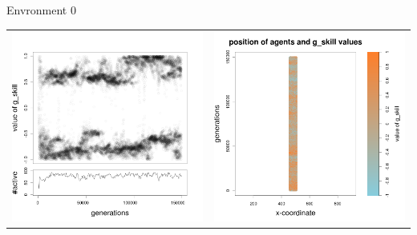 \documentclass[8pt, handout=show,notes=show]{beamer}
\begin{document}
\begin{frame}{Envronment 0}
\begin{table}[H]
\begin{tabular}{cc}
\newline
\includegraphics[width=\imgSize]{../images/5StaticEnv/Gplot47_staticEnv0}&\includegraphics[width=\imgSize]{../images/5StaticEnv/Gplot47Static_staticEnv0}\\
\end{tabular}


\end{table}
\end{frame}
\end{document}
